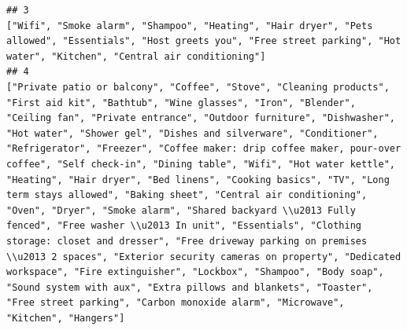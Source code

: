 \documentclass[
]{article}
\begin{document}
\begin{verbatim}
## 3                                                                                                                                                                                                                                                                                                                                                                                                                                                                                                                                                                                                                                                                                                                                                                                                                                                                                                                                                                                                                                        ["Wifi", "Smoke alarm", "Shampoo", "Heating", "Hair dryer", "Pets allowed", "Essentials", "Host greets you", "Free street parking", "Hot water", "Kitchen", "Central air conditioning"]
## 4                                                                                                                                                                ["Private patio or balcony", "Coffee", "Stove", "Cleaning products", "First aid kit", "Bathtub", "Wine glasses", "Iron", "Blender", "Ceiling fan", "Private entrance", "Outdoor furniture", "Dishwasher", "Hot water", "Shower gel", "Dishes and silverware", "Conditioner", "Refrigerator", "Freezer", "Coffee maker: drip coffee maker, pour-over coffee", "Self check-in", "Dining table", "Wifi", "Hot water kettle", "Heating", "Hair dryer", "Bed linens", "Cooking basics", "TV", "Long term stays allowed", "Baking sheet", "Central air conditioning", "Oven", "Dryer", "Smoke alarm", "Shared backyard \\u2013 Fully fenced", "Free washer \\u2013 In unit", "Essentials", "Clothing storage: closet and dresser", "Free driveway parking on premises \\u2013 2 spaces", "Exterior security cameras on property", "Dedicated workspace", "Fire extinguisher", "Lockbox", "Shampoo", "Body soap", "Sound system with aux", "Extra pillows and blankets", "Toaster", "Free street parking", "Carbon monoxide alarm", "Microwave", "Kitchen", "Hangers"]

\end{verbatim}
\end{document}
